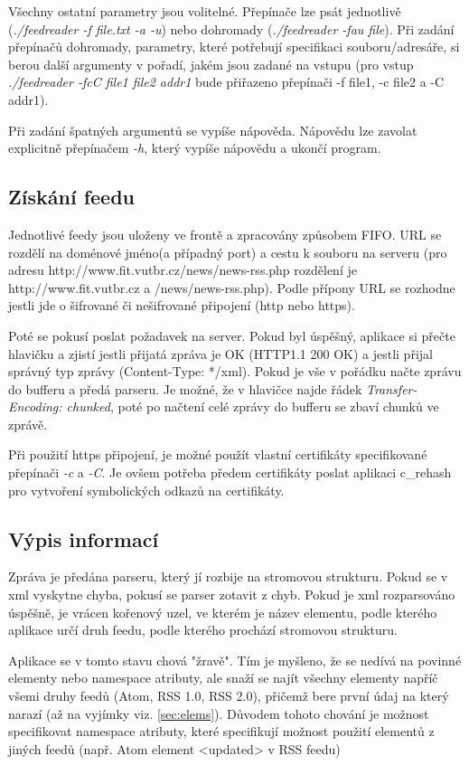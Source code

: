 \documentclass[11pt] {article}
\begin{document}
Všechny ostatní parametry jsou volitelné. Přepínače lze psát jednotlivě (\emph{./feedreader -f file.txt -a -u}) nebo dohromady (\emph{./feedreader -fau file}). Při zadání přepínačů dohromady, parametry, které potřebují specifikaci souboru/adresáře, si berou další argumenty v pořadí, jakém jsou zadané na vstupu (pro vstup \emph{./feedreader -fcC file1 file2 addr1} bude přiřazeno přepínači -f file1, -c file2 a -C addr1).

Při zadání špatných argumentů se vypíše nápověda. Nápovědu lze zavolat explicitně přepínačem \emph{-h}, který vypíše nápovědu a ukončí program.

\subsection{Získání feedu}
\hspace{5mm}Jednotlivé feedy jsou uloženy ve frontě a zpracovány způsobem FIFO. URL se rozdělí na doménové jméno(a případný port) a cestu k souboru na serveru (pro adresu http://www.fit.vutbr.cz/news/news-rss.php rozdělení je http://www.fit.vutbr.cz a /news/news-rss.php). Podle přípony URL se rozhodne jestli jde o šifrované či nešifrované připojení (http nebo https).

Poté se pokusí poslat požadavek na server. Pokud byl úspěšný, aplikace si přečte hlavičku a zjistí jestli přijatá zpráva je OK (HTTP1.1 200 OK) a jestli přijal správný typ zprávy (Content-Type: */xml). Pokud je vše v pořádku načte zprávu do bufferu a předá parseru.
Je možné, že v hlavičce najde řádek \emph{Transfer-Encoding: chunked}, poté po načtení celé zprávy do bufferu se zbaví chunků ve zprávě. \cite{encod}

Při použití https připojení, je možné použít vlastní certifikáty specifikované přepínači \emph{-c} a \emph{-C}. Je ovšem potřeba předem certifikáty poslat aplikaci c\_rehash pro vytvoření symbolických odkazů na certifikáty.

\subsection{Výpis informací}
\hspace{5mm}Zpráva je předána parseru, který jí rozbije na stromovou strukturu. Pokud se v xml vyskytne chyba, pokusí se parser zotavit z chyb. Pokud je xml rozparsováno úspěšně, je vrácen kořenový uzel, ve kterém je název elementu, podle kterého aplikace určí druh feedu, podle kterého prochází stromovou strukturu.

Aplikace se v tomto stavu chová "žravě". Tím je myšleno, že se nedívá na povinné elementy  nebo namespace atributy, ale snaží se najít všechny elementy napříč všemi druhy feedů (Atom, RSS 1.0, RSS 2.0), přičemž bere první údaj na který narazí (až na vyjímky viz. \ref{sec:elems}). Důvodem tohoto chování je možnost specifikovat namespace atributy, které specifikují možnost použití elementů z jiných feedů (např. Atom element <updated> v RSS feedu)
\end{document}
